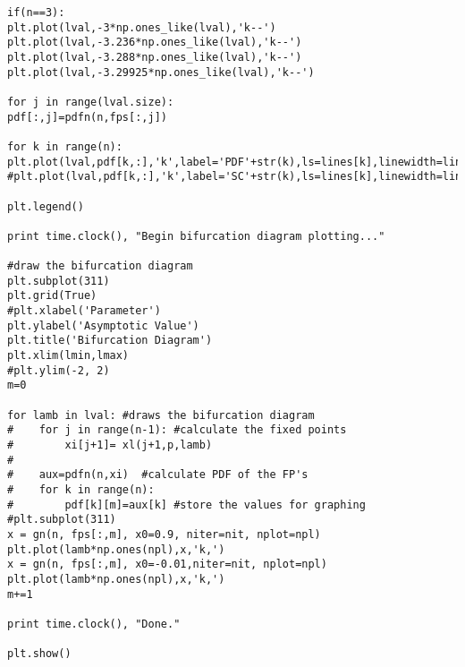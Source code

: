 \documentclass[10pt,twoside,titlepage]{book}
\numberwithin{equation}{chapter}
\numberwithin{figure}{chapter}
\numberwithin{table}{chapter}
\theoremstyle{plain}%
\theoremstyle{definition}
\theoremstyle{remark}
\begin{document}
\begin{verbatim}
if(n==3):
plt.plot(lval,-3*np.ones_like(lval),'k--')
plt.plot(lval,-3.236*np.ones_like(lval),'k--')
plt.plot(lval,-3.288*np.ones_like(lval),'k--')
plt.plot(lval,-3.29925*np.ones_like(lval),'k--')

for j in range(lval.size):
pdf[:,j]=pdfn(n,fps[:,j])

for k in range(n):
plt.plot(lval,pdf[k,:],'k',label='PDF'+str(k),ls=lines[k],linewidth=linw[k])
#plt.plot(lval,pdf[k,:],'k',label='SC'+str(k),ls=lines[k],linewidth=linw[k])

plt.legend()

print time.clock(), "Begin bifurcation diagram plotting..."

#draw the bifurcation diagram
plt.subplot(311)
plt.grid(True)
#plt.xlabel('Parameter')
plt.ylabel('Asymptotic Value')
plt.title('Bifurcation Diagram')
plt.xlim(lmin,lmax)
#plt.ylim(-2, 2)
m=0

for lamb in lval: #draws the bifurcation diagram
#    for j in range(n-1): #calculate the fixed points
#        xi[j+1]= xl(j+1,p,lamb)
#
#    aux=pdfn(n,xi)  #calculate PDF of the FP's
#    for k in range(n):
#        pdf[k][m]=aux[k] #store the values for graphing
#plt.subplot(311)
x = gn(n, fps[:,m], x0=0.9, niter=nit, nplot=npl)
plt.plot(lamb*np.ones(npl),x,'k,')
x = gn(n, fps[:,m], x0=-0.01,niter=nit, nplot=npl)
plt.plot(lamb*np.ones(npl),x,'k,')
m+=1

print time.clock(), "Done."

plt.show()
\end{verbatim}

\listoftables
\listoffigures
\end{document}

